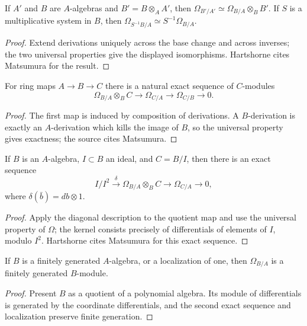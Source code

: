 \begin{proposition}
\label{prop:II-8-2A}
If $A'$ and $B$ are $A$-algebras and $B'=B\otimes_AA'$, then
$\Omega_{B'/A'}\simeq\Omega_{B/A}\otimes_BB'$.  If $S$ is a multiplicative system in $B$, then
$\Omega_{S^{-1}B/A}\simeq S^{-1}\Omega_{B/A}$.
\end{proposition}
\begin{proof}
Extend derivations uniquely across the base change and across inverses; the two universal properties
give the displayed isomorphisms.  Hartshorne cites Matsumura for the result.
\end{proof}

\begin{proposition}
\label{prop:II-8-3A}
For ring maps $A\to B\to C$ there is a natural exact sequence of $C$-modules
\[
\Omega_{B/A}\otimes_BC\longrightarrow\Omega_{C/A}\longrightarrow\Omega_{C/B}\longrightarrow0.
\]
\end{proposition}
\begin{proof}
The first map is induced by composition of derivations.  A $B$-derivation is exactly an $A$-derivation
which kills the image of $B$, so the universal property gives exactness; the source cites Matsumura.
\end{proof}

\begin{proposition}
\label{prop:II-8-4A}
If $B$ is an $A$-algebra, $I\subset B$ an ideal, and $C=B/I$, then there is an exact sequence
\[
I/I^2\xrightarrow{\delta}\Omega_{B/A}\otimes_BC\longrightarrow\Omega_{C/A}\longrightarrow0,
\]
where $\delta(\bar b)=db\otimes1$.
\end{proposition}
\begin{proof}
Apply the diagonal description to the quotient map and use the universal property of $\Omega$;
the kernel consists precisely of differentials of elements of $I$, modulo $I^2$.  Hartshorne cites
Matsumura for this exact sequence.
\end{proof}

\begin{corollary}
\label{cor:II-8-5}
If $B$ is a finitely generated $A$-algebra, or a localization of one, then $\Omega_{B/A}$ is a
finitely generated $B$-module.
\end{corollary}
\begin{proof}
Present $B$ as a quotient of a polynomial algebra.  Its module of differentials is generated by the
coordinate differentials, and the second exact sequence and localization preserve finite generation.
\end{proof}

